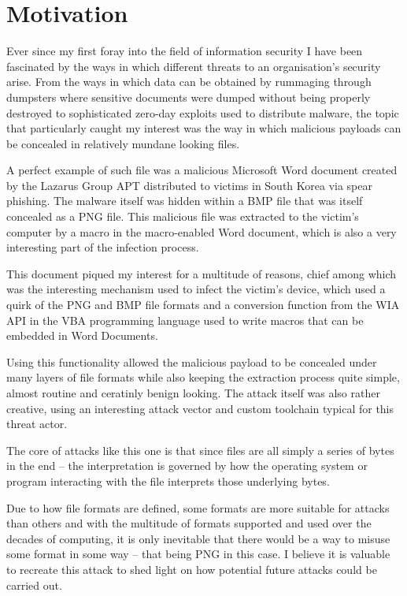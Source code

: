\chapter{Motivation}
Ever since my first foray into the field of information security I have been fascinated by the ways in which
different threats to an organisation's security arise. From the ways in which data can be obtained by rummaging
through dumpsters where sensitive documents were dumped without being properly destroyed to sophisticated zero-day
exploits used to distribute malware, the topic that particularly caught my interest was the way in which malicious
payloads can be concealed in relatively mundane looking files.

A perfect example of such file was a malicious Microsoft Word document created by the Lazarus Group \acrlong{APT}
distributed to victims in South Korea via spear phishing. The malware itself was hidden within a \acrfull{BMP} file 
that was itself concealed as a \acrfull{PNG} file. This malicious file was extracted to the victim's computer by 
a macro in the macro-enabled Word document, which is also a very interesting part of the infection process. 

This document piqued my interest for a multitude of reasons, chief among which was the interesting mechanism used
to infect the victim's device, which used a quirk of the \acrshort{PNG} and \acrshort{BMP} file formats and a conversion 
function from the \acrfull{WIA} \acrshort{API} in the \acrfull{VBA} programming language used to write macros 
that can be embedded in Word Documents. 

Using this functionality allowed the malicious payload to be concealed under many layers of file formats while also keeping
the extraction process quite simple, almost routine and ceratinly benign looking. The attack itself was also rather 
creative, using an interesting attack vector and custom toolchain typical for this threat actor.

The core of attacks like this one is that since files are all simply a series of bytes in the end -- the
interpretation is governed by how the operating system or program interacting with the file interprets 
those underlying bytes. 

Due to how file formats are defined, some formats are more suitable for attacks than others
and with the multitude of formats supported and used over the decades of computing, it is only inevitable that 
there would be a way to misuse some format in some way -- that being \acrshort{PNG} in this case. 
I believe it is valuable to recreate this attack to shed light on how potential future attacks could be carried out.

